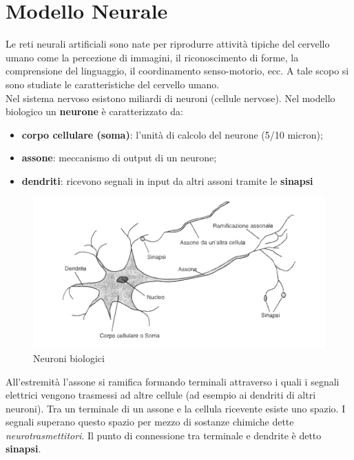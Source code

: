 
\chapter{Modello Neurale} %
\label{cha:modello_neurale}
Le reti neurali artificiali sono nate per riprodurre attività tipiche del cervello umano come la percezione di immagini, il riconoscimento di forme, la comprensione del linguaggio, il coordinamento senso-motorio, ecc. A tale scopo si sono studiate le caratteristiche del cervello umano.\\									

Nel sistema nervoso esistono miliardi di neuroni (cellule nervose).
Nel modello biologico un \textbf{neurone} è caratterizzato da:
\begin{itemize}
	\item \textbf{corpo cellulare (soma)}: l'unità di calcolo del neurone (5/10 micron);
	\item \textbf{assone}: meccanismo di output di un neurone;
	\item \textbf{dendriti}: ricevono segnali in input da altri assoni tramite le \textbf{sinapsi}
\end{itemize}

\begin{figure}[h!]
	\centering
	\includegraphics[width=\textwidth]{images/neuron.png}
	\caption{Neuroni biologici}\label{fig:neuron}
\end{figure}

All’estremità l'assone si ramifica formando terminali attraverso i quali i segnali elettrici vengono trasmessi ad altre cellule (ad esempio ai dendriti di altri neuroni). Tra un terminale di un assone e la cellula ricevente esiste uno spazio. I segnali superano questo spazio per mezzo di sostanze chimiche dette \emph{neurotrasmettitori}. Il punto di connessione tra terminale e dendrite è detto \textbf{sinapsi}.


